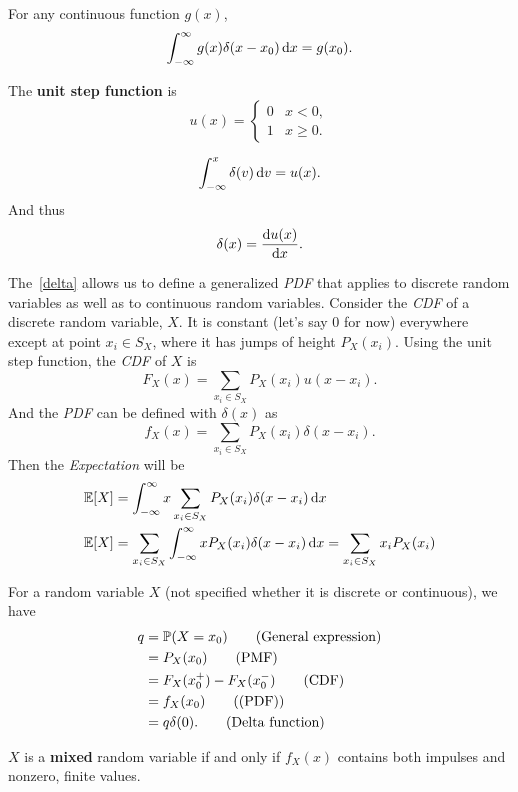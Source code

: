 \begin{theorem}
    For any continuous function $g(x)$,
    \[\int_{-\infty}^{\infty}g(x)\delta(x-x_0)\mathop{}\!\mathrm{d} x = g(x_0).\]
\end{theorem}

\begin{definition}
    The \textbf{unit step function} is
    \[u(x)={
        \begin{cases}
            0 & x<0, \\
            1 & x\geq 0.
        \end{cases}
    }\]
\end{definition}

\begin{theorem}\label{delta}
    \[\int_{-\infty}^{x}\delta(v)\mathop{}\!\mathrm{d} v = u(x).\]
    And thus
    \[\delta(x)=\frac{\mathop{}\!\mathrm{d} u(x)}{\mathop{}\!\mathrm{d} x}.\]
\end{theorem}

\begin{corollary}
    The~\cref{delta} allows us to define a generalized \emph{PDF} that applies to discrete random variables as well as to continuous random variables. Consider the \emph{CDF} of a discrete random variable, $X$. It is constant (let's say $0$ for now) everywhere except at point $x_i\in S_X$, where it has jumps of height $P_X(x_i)$. Using the unit step function, the \emph{CDF} of $X$ is
    \[F_X(x)=\sum_{x_i\in S_X} P_X(x_i)u(x-x_i).\]
    And the \emph{PDF} can be defined with $\delta(x)$ as
    \[f_X(x)=\sum_{x_i\in S_X}P_X(x_i)\delta(x-x_i).\]
    Then the \emph{Expectation} will be
    \begin{align*}
        \E{X} &= \int_{-\infty}^{\infty}x\sum_{x_i\in S_X}P_X(x_i)\delta(x-x_i)\diff x \\
        \E{X} &= \sum_{x_i\in S_X}\int_{-\infty}^{\infty}xP_X(x_i)\delta(x-x_i)\diff x = \sum_{x_i\in S_X}x_i P_X(x_i)
    \end{align*}
\end{corollary}

\begin{theorem}
    For a random variable $X$ (not specified whether it is discrete or continuous), we have
    \begin{align*}
        q
        &= \P{X=x_0}  \tag{General expression} \\
        &= P_X(x_0)  \tag{PMF} \\
        &= F_X(x_0^+) - F_X(x_0^-)  \tag{CDF} \\
        &= f_X(x_0)  \tag{(PDF)} \\
        &= q\delta(0).  \tag{Delta function}
    \end{align*}
\end{theorem}

\begin{theorem}
    $X$ is a \textbf{mixed} random variable if and only if $f_X(x)$ contains both impulses and nonzero, finite values.
\end{theorem}
\fi